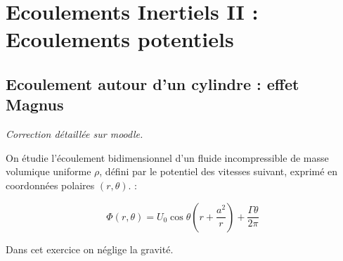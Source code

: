 

\setcounter{section}{7}

\section{Ecoulements Inertiels II : Ecoulements potentiels}

\setcounter{subsection}{-1}


\subsection{Ecoulement autour d'un cylindre : effet Magnus} 

{\em Correction détaillée sur moodle.}


\vspace{1cm}

On étudie l'écoulement bidimensionnel d'un fluide incompressible de masse volumique uniforme 
$\rho$, défini par le potentiel des vitesses suivant, 
exprimé en coordonnées polaires $(r,\theta)$. :  


  \begin{equation}
   \Phi(r,\theta) =  U_0   \cos \theta \left( r + \frac{a^2}{r}\right)  
   + \frac{\Gamma \theta }{2 \pi}
  \end{equation}
  
Dans cet exercice on néglige la gravité.


